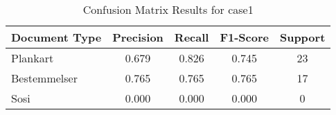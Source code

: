 \begin{table}[h]
\centering
\begin{tabular}{l|cccc}
\hline
Document Type & Precision & Recall & F1-Score & Support \\
\hline
Plankart & 0.679 & 0.826 & 0.745 & 23 \\
Bestemmelser & 0.765 & 0.765 & 0.765 & 17 \\
Sosi & 0.000 & 0.000 & 0.000 & 0 \\
\hline
\end{tabular}
\caption{Confusion Matrix Results for case1}
\end{table}
